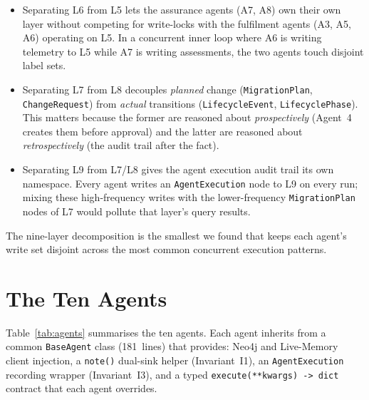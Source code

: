 \documentclass[acmtog]{acmart}
\renewcommand\_{\textunderscore\allowbreak}
\begin{document}
\begin{itemize}
  \item Separating L6 from L5 lets the assurance agents (A7, A8)
    own their own layer without competing for write-locks with the
    fulfilment agents (A3, A5, A6) operating on L5. In a concurrent
    inner loop where A6 is writing telemetry to L5 while A7 is
    writing assessments, the two agents touch disjoint label sets.

  \item Separating L7 from L8 decouples \emph{planned} change
    (\texttt{MigrationPlan}, \texttt{ChangeRequest}) from
    \emph{actual} transitions (\texttt{LifecycleEvent},
    \texttt{LifecyclePhase}). This matters because the former are
    reasoned about \emph{prospectively} (Agent~4 creates them before
    approval) and the latter are reasoned about
    \emph{retrospectively} (the audit trail after the fact).

  \item Separating L9 from L7/L8 gives the agent execution audit
    trail its own namespace. Every agent writes an
    \texttt{AgentExecution} node to L9 on every run; mixing these
    high-frequency writes with the lower-frequency
    \texttt{MigrationPlan} nodes of L7 would pollute that layer's
    query results.
\end{itemize}

The nine-layer decomposition is the smallest we found that keeps
each agent's write set disjoint across the most common concurrent
execution patterns.


\section{The Ten Agents}\label{sec:agents}

Table~\ref{tab:agents} summarises the ten agents. Each agent
inherits from a common \texttt{BaseAgent} class (181~lines) that
provides: Neo4j and Live-Memory client injection, a
\texttt{\_note()} dual-sink helper (Invariant~I1), an
\texttt{AgentExecution} recording wrapper (Invariant~I3), and
a typed \texttt{\_execute(**kwargs) -> dict} contract that each
agent overrides.
\end{document}
